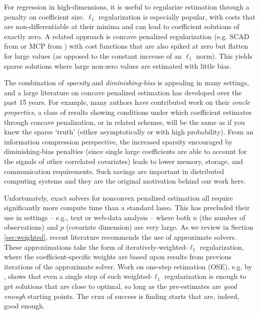\documentclass[12pt]{article}
\begin{document}
For regression in high-dimensions, it is useful to regularize estimation
through a penalty on coefficient size.   $\ell_1$  regularization \citep[i.e.,
the lasso of][]{tibshirani_regression_1996} is especially popular, with costs
that are non-differentiable at their minima and can lead to  coefficient
solutions of exactly zero.  A related approach is concave penalized
regularization (e.g. SCAD from \citealt{fan_variable_2001} or MCP from
\citealt{zhang_nearly_2010}) with cost functions that are also spiked at zero
but flatten for large values (as opposed to the constant increase of an $\ell_1$
norm).  This yields sparse solutions where  large non-zero values are estimated
with little bias. 

The combination of  \textit{sparsity} and \textit{diminishing-bias} 
 is appealing in many settings, and a large literature on concave
penalized estimation has developed over the past 15 years.  For example, many
authors \citep{fan_variable_2001,fan_nonconcave_2004}  have contributed work on their \textit{oracle
properties}, a class of results showing conditions under which coefficient
estimates through concave penalization, or in related schemes, will be the
same as if you knew the sparse `truth' (either asymptotically or with high
probability).   From an information compression perspective,  the increased
sparsity encouraged by diminishing-bias penalties (since single large
coefficients are able to account for the signals of other correlated
covariates) leads to lower memory, storage, and communication requirements.
Such savings are important in distributed  computing systems
\citep[e.g.,][]{taddy_distributed_2015} and they are the original motivation behind our work here.


Unfortunately,  exact solvers for nonconvex penalized estimation  all require
significantly more compute time than a standard lasso.  This has precluded their use in settings -- e.g., text or web-data analysis
-- where both $n$ (the number of observations) and $p$ (covariate dimension)
   are very large. As we review in Section \ref{sec:weighted},  recent
   literature recommends the use of approximate solvers. These approximations
   take the form of iteratively-weighted-$\ell_1$ regularization, where the
   coefficient-specific weights are based upon results from previous
   iterations of the approximate solver.  Work on one-step estimation (OSE),
   e.g. by
   \cite{zou_one-step_2008}, shows that even a single step of such
   weighted-$\ell_1$ regularization is enough to get solutions that are close to
   optimal, so long as the pre-estimates are
\textit{good enough} starting points. 
The crux of success is  finding starts that are, indeed, good enough.
\end{document}
